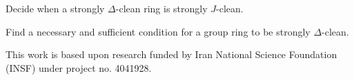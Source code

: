 \documentclass[12pt]{amsart}
\theoremstyle{definition}
\begin{document}
 Decide when a strongly $\Delta$-clean ring is strongly $J$-clean.

\medskip

 Find a necessary and sufficient condition for a group ring to be strongly $\Delta$-clean.

\medskip
\medskip
\medskip
\medskip


 This work is based upon research funded by Iran National Science Foundation (INSF) under project no. 4041928.

\vskip4.0pc
\end{document}
